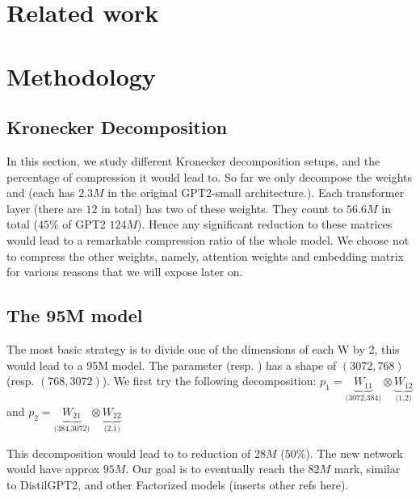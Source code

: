 \documentclass{article}
\begin{document}
\section{Related work}%
\label{sec:Related work}




\section{Methodology}%
\label{sec:Training setups}

\subsection{Kronecker Decomposition}%
\label{sub:Kronecker Decomposition}

In this section, we study different Kronecker decomposition setups, and the percentage of compression it would  lead to. So far we only decompose the weights  and  (each has $2.3M$ in the original GPT2-small architecture.). Each transformer layer (there are $12$ in total) has two of these weights. They count to $56.6M$ in total ($45\%$ of GPT2 $124M$). Hence any significant reduction to these matrices would lead to a remarkable compression ratio of the whole model. We choose not to compress the other weights, namely, attention weights and embedding matrix for various reasons that we will expose later on. 

\subsection{The 95M model}%
\label{sub:The 95M model}
The most basic strategy is to divide one of the dimensions of each W by 2, this would lead to a 95M model. The parameter  (resp. ) has a shape of $(3072, 768)$ (resp.  $(768, 3072)$). We first try the following decomposition: $p_1 = \underbrace{W_{11}}_{\text{(3072,384)}} \otimes \underbrace{W_{12}}_{\text{(1,2)}}$  and $p_2 = \underbrace{W_{21}}_{\text{(384,3072)}} \otimes \underbrace{W_{22}}_{\text{(2,1)}}$  


This decomposition would lead to to reduction of $28M$ ($50\%$). The new network would have approx $95M$. Our goal is to eventually reach the $82M$ mark, similar to DistilGPT2, and other Factorized models (inserts other refs here).
\end{document}
